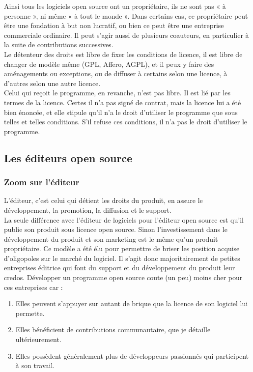 					Ainsi tous les logiciels open source ont un propriétaire, ils ne sont pas « à personne », ni même « à tout le monde ». Dans certains cas, ce propriétaire peut être une fondation à but non lucratif, ou bien ce peut être une entreprise commerciale ordinaire. Il peut s'agir aussi de plusieurs coauteurs, en particulier à la suite de contributions successives.\\

					Le détenteur des droits est libre de fixer les conditions de licence, il est libre de changer de modèle même (GPL, Affero, AGPL), et il peux y faire des aménagements ou exceptions, ou de diffuser à certains selon une licence, à d'autres selon une autre licence.\\

					Celui qui reçoit le programme, en revanche, n'est pas libre. Il est lié par les termes de la licence. Certes il n'a pas signé de contrat, mais la licence lui a été bien énoncée, et elle stipule qu'il n'a le droit d'utiliser le programme que sous telles et telles conditions. S'il refuse ces conditions, il n'a pas le droit d'utiliser le programme. 
					
		\subsection{Les éditeurs open source}

			\subsubsection{Zoom sur l'éditeur}

				L'éditeur, c'est celui qui détient les droits du produit, en assure le développement, la promotion, la diffusion et le support.\\
			
				La seule différence avec l'éditeur de logiciels pour l'éditeur open source est qu'il publie son produit sous licence open source. Sinon l'investissement dans le développement du produit et son marketing est le même qu'un produit propriétaire.
				Ce modèle a été élu pour permettre de briser les position acquise d'oligopoles sur le marché du logiciel.
				Il s'agit donc majoritairement de petites entreprises éditrice qui font du support et du développement du produit leur credos.
				Développer un programme open source coute (un peu) moins cher pour ces entreprises car :

				\begin{enumerate}[font=\color{burntorange}]
		 			\item Elles peuvent s'appuyer sur autant de brique que la licence de son logiciel lui permette.
		 			\item Elles bénéficient de contributions communautaire, que je détaille ultérieurement.
			 		\item Elles possèdent généralement plus de développeurs passionnés qui participent à son travail.
				\end{enumerate}

